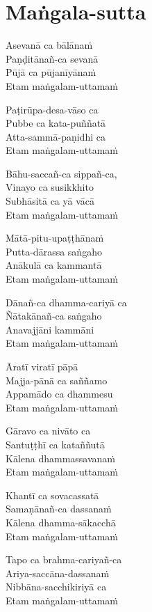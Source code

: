 \clearpage

\chapter{Maṅgala-sutta}


\begin{paritta}
Asevanā ca bālānaṁ\\
Paṇḍitānañ-ca sevanā\\
Pūjā ca pūjanīyānaṁ\\
Etam maṅgalam-uttamaṁ

Paṭirūpa-desa-vāso ca\\
Pubbe ca kata-puññatā\\
Atta-sammā-paṇidhi ca\\
Etam maṅgalam-uttamaṁ

Bāhu-saccañ-ca sippañ-ca,\\
Vinayo ca susikkhito\\
Subhāsitā ca yā vācā\\
Etam maṅgalam-uttamaṁ

Mātā-pitu-upaṭṭhānaṁ\\
Putta-dārassa saṅgaho\\
Anākulā ca kammantā\\
Etam maṅgalam-uttamaṁ

Dānañ-ca dhamma-cariyā ca\\
Ñātakānañ-ca saṅgaho\\
Anavajjāni kammāni\\
Etam maṅgalam-uttamaṁ

Āratī viratī pāpā\\
Majja-pānā ca saññamo\\
Appamādo ca dhammesu\\
Etam maṅgalam-uttamaṁ

Gāravo ca nivāto ca\\
Santuṭṭhī ca kataññutā\\
Kālena dhammassavanaṁ\\
Etam maṅgalam-uttamaṁ

Khantī ca sovacassatā\\
Samaṇānañ-ca dassanaṁ\\
Kālena dhamma-sākacchā\\
Etam maṅgalam-uttamaṁ

Tapo ca brahma-cariyañ-ca\\
Ariya-saccāna-dassanaṁ\\
Nibbāna-sacchikiriyā ca\\
Etam maṅgalam-uttamaṁ


\end{paritta}
